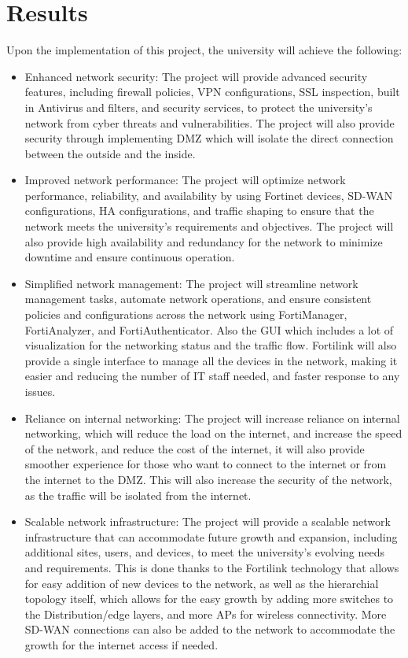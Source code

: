 \documentclass[12pt]{report}
\begin{document}
\section{Results}
Upon the implementation of this project, the university will achieve the following:
\begin{itemize}
    \item Enhanced network security: The project will provide advanced security features, including firewall policies, VPN configurations, SSL inspection, built in Antivirus and filters, and security services, to protect the university's network from cyber threats and vulnerabilities. The project will also provide security through implementing DMZ which will isolate the direct connection between the outside and the inside.
    \item Improved network performance: The project will optimize network performance, reliability, and availability by using Fortinet devices, SD-WAN configurations, HA configurations, and traffic shaping to ensure that the network meets the university's requirements and objectives. The project will also provide high availability and redundancy for the network to minimize downtime and ensure continuous operation. 
    \item Simplified network management: The project will streamline network management tasks, automate network operations, and ensure consistent policies and configurations across the network using FortiManager, FortiAnalyzer, and FortiAuthenticator. Also the GUI which includes a lot of visualization for the networking status and the traffic flow. Fortilink will also provide a single interface to manage all the devices in the network, making it easier and reducing the number of IT staff needed, and faster response to any issues.
    \item Reliance on internal networking: The project will increase reliance on internal networking, which will reduce the load on the internet, and increase the speed of the network, and reduce the cost of the internet, it will also provide smoother experience for those who want to connect to the internet or from the internet to the DMZ. This will also increase the security of the network, as the traffic will be isolated from the internet.
    \item Scalable network infrastructure: The project will provide a scalable network infrastructure that can accommodate future growth and expansion, including additional sites, users, and devices, to meet the university's evolving needs and requirements. This is done thanks to the Fortilink technology that allows for easy addition of new devices to the network, as well as the hierarchial topology itself, which allows for the easy growth by adding more switches to the Distribution/edge layers, and more APs for wireless connectivity. More SD-WAN connections can also be added to the network to accommodate the growth for the internet access if needed.  

\end{itemize}
\end{document}
